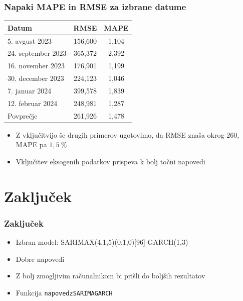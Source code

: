 \documentclass[14p, hyperref={unicode}]{beamer}
\begin{document}
\begin{frame}
    
    \frametitle{Napaki MAPE in RMSE za izbrane datume} 

    \begin{table}[!ht]
        \footnotesize
        \centering
        \label{Tab:RMSE_MAPE}
        \begin{tabular}{l|c|c}
            Datum & RMSE & MAPE \\ \hline
            5. avgust 2023 & 156,600 & 1,104 \\ 
            24. september 2023 & 365,372 & 2,392 \\ 
            16. november 2023 & 176,901 & 1,199 \\ 
            30. december 2023 & 224,123 & 1,046 \\ 
            7. januar 2024 & 399,578 & 1,839 \\ 
            12. februar 2024 & 248,981 & 1,287 \\ \hline
            Povprečje & 261,926 & 1,478 \\ 
        \end{tabular}
    \end{table}

    \begin{itemize}
        \item Z vključitvijo še drugih primerov ugotovimo, da RMSE znaša okrog $260$, MAPE pa $1{,}5~\%$
        \item Vključitev eksogenih podatkov prispeva k bolj točni napovedi
    \end{itemize}

\end{frame}




\section{Zaključek}



\begin{frame}
    
    \frametitle{Zaključek} 

    \begin{itemize}
        \item Izbran model: SARIMAX(4,1,5)(0,1,0)[96]-GARCH(1,3)
        \item Dobre napovedi
        \item Z bolj zmogljivim računalnikom bi prišli do boljših rezultatov
        \item Funkcija \texttt{napoved\underline{\enskip}z\underline{\enskip}SARIMA\underline{\enskip}GARCH}
    \end{itemize}

\end{frame}
\end{document}
